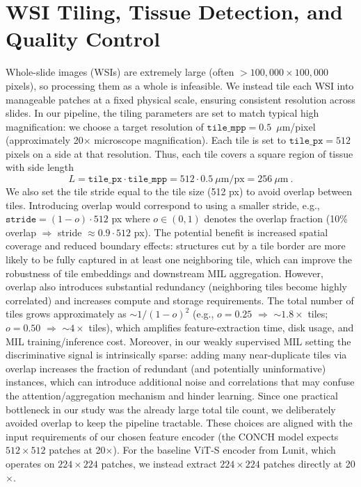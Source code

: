 \section{WSI Tiling, Tissue Detection, and Quality Control}
\label{sec:tiling_detail}
Whole-slide images (WSIs) are extremely large (often $>100,000\times100,000$ pixels), so processing them as a whole is infeasible. We instead tile each WSI into manageable patches at a fixed physical scale, ensuring consistent resolution across slides. In our pipeline, the tiling parameters are set to match typical high magnification: we choose a target resolution of $\texttt{tile\_mpp} = 0.5$~$\mu$m/pixel (approximately 20$\times$ microscope magnification). Each tile is set to $\texttt{tile\_px} = 512$ pixels on a side at that resolution. Thus, each tile covers a square region of tissue with side length
\begin{equation}\label{eq:tile_physical_size}
L = \texttt{tile\_px}\cdot \texttt{tile\_mpp} = 512 \cdot 0.5~\mu\text{m/px} = 256~\mu\text{m}~.
\end{equation}
We also set the tile stride equal to the tile size (512 px) to avoid overlap between tiles. Introducing overlap would correspond to using a smaller stride, e.g., $\texttt{stride}=(1-o)\cdot512$ px where $o\in(0,1)$ denotes the overlap fraction (10\% overlap $\Rightarrow$ stride $\approx0.9\cdot512$ px). The potential benefit is increased spatial coverage and reduced boundary effects: structures cut by a tile border are more likely to be fully captured in at least one neighboring tile, which can improve the robustness of tile embeddings and downstream MIL aggregation. However, overlap also introduces substantial redundancy (neighboring tiles become highly correlated) and increases compute and storage requirements. The total number of tiles grows approximately as $\sim 1/(1-o)^2$ (e.g., $o=0.25$ $\Rightarrow$ $\sim1.8\times$ tiles; $o=0.50$ $\Rightarrow$ $\sim4\times$ tiles), which amplifies feature-extraction time, disk usage, and MIL training/inference cost. Moreover, in our weakly supervised MIL setting the discriminative signal is intrinsically sparse: adding many near-duplicate tiles via overlap increases the fraction of redundant (and potentially uninformative) instances, which can introduce additional noise and correlations that may confuse the attention/aggregation mechanism and hinder learning. Since one practical bottleneck in our study was the already large total tile count, we deliberately avoided overlap to keep the pipeline tractable. These choices are aligned with the input requirements of our chosen feature encoder (the CONCH model expects $512\times512$ patches at 20$\times$). For the baseline ViT-S encoder from Lunit, which operates on $224\times224$ patches, we instead extract $224\times224$ patches directly at 20$\times$.

